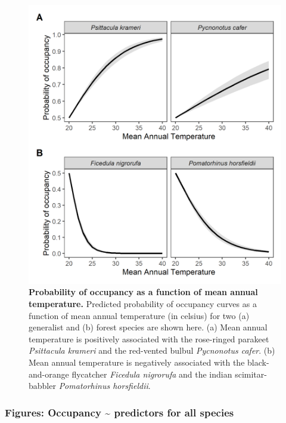 \documentclass[
]{article}
\begin{document}
\begin{figure}
\centering
\includegraphics{figs/fig_05.png}
\caption{\textbf{Probability of occupancy as a function of mean annual temperature.}
Predicted probability of occupancy curves as a function of mean annual temperature (in celsius) for two (a) generalist and (b) forest species are shown here. (a) Mean annual temperature is positively associated with the rose-ringed parakeet \emph{Psittacula krameri} and the red-vented bulbul \emph{Pycnonotus cafer}. (b) Mean annual temperature is negatively associated with the black-and-orange flycatcher \emph{Ficedula nigrorufa} and the indian scimitar-babbler \emph{Pomatorhinus horsfieldii}.}
\end{figure}

\hypertarget{figures-occupancy-predictors-for-all-species}{%
\subsubsection{Figures: Occupancy \textasciitilde{} predictors for all species}\label{figures-occupancy-predictors-for-all-species}}
\end{document}
